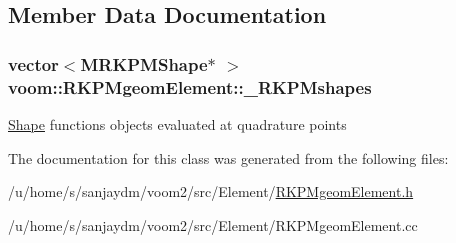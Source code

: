 \subsection{Member Data Documentation}
\hypertarget{classvoom_1_1_r_k_p_mgeom_element_a523f9b8a58ef870105d7afc70243d40d}{
\subsubsection[{\_\-RKPMshapes}]{\setlength{\rightskip}{0pt plus 5cm}vector$<${\bf MRKPMShape}$\ast$ $>$ {\bf voom::RKPMgeomElement::\_\-RKPMshapes}}}
\label{classvoom_1_1_r_k_p_mgeom_element_a523f9b8a58ef870105d7afc70243d40d}
\hyperlink{classvoom_1_1_shape}{Shape} functions objects evaluated at quadrature points 

The documentation for this class was generated from the following files:\begin{DoxyCompactItemize}
\item 
/u/home/s/sanjaydm/voom2/src/Element/\hyperlink{_r_k_p_mgeom_element_8h}{RKPMgeomElement.h}\item 
/u/home/s/sanjaydm/voom2/src/Element/RKPMgeomElement.cc\end{DoxyCompactItemize}
